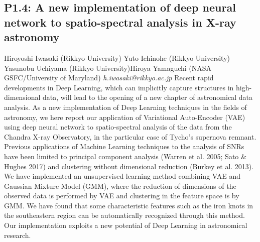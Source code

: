\documentclass{report}
\begin{document}
\subsection*{P1.4: A new implementation of deep neural network to spatio-spectral analysis in X-ray astronomy}
\bigskip
Hiroyoshi Iwasaki (Rikkyo University) \newline Yuto Ichinohe (Rikkyo University) \newline  Yasunobu Uchiyama (Rikkyo University)\newline  Hiroya Yamaguchi (NASA GSFC/University of Maryland)\newline  \newline  \newline\newline
{\it h.iwasaki@rikkyo.ac.jp}\newline
\newline\newline
Recent rapid developments in Deep Learning, which can implicitly capture structures in high-dimensional data, will lead to the opening of a new chapter of astronomical data analysis. As a new implementation of Deep Learning techniques in the fields of astronomy, we here report our application of Variational Auto-Encoder (VAE) using deep neural network to spatio-spectral analysis of the data from the Chandra X-ray Observatory, in the particular case of Tycho’s supernova remnant. Previous applications of Machine Learning techniques to the analysis of SNRs have been limited to principal component analysis (Warren et al. 2005; Sato \& Hughes 2017) and clustering without dimensional reduction (Burkey et al. 2013). We have implemented an unsupervised learning method combining VAE and Gaussian Mixture Model (GMM), where the reduction of dimensions of the observed data is performed by VAE and clustering in the feature space is by GMM. We have found that some characteristic features such as the iron knots in the southeastern region can be automatically recognized through this method. Our implementation exploits a new potential of Deep Learning in astronomical research.\newline
\newpage
\end{document}
